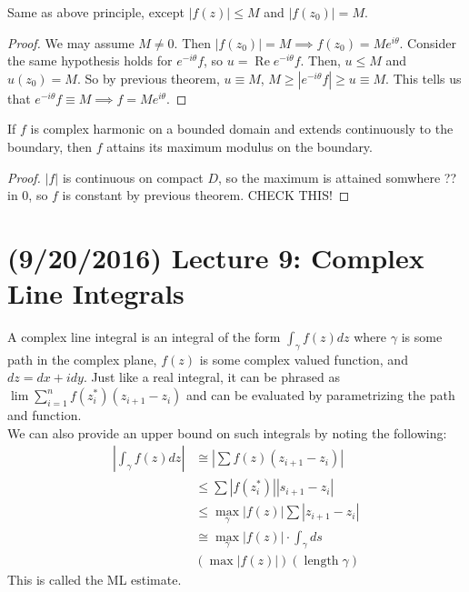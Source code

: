 \documentclass[11pt,leqno,oneside]{amsart}
\renewcommand{\Re}{\operatorname{Re}}
\begin{document}
  \begin{thm}
    Same as above principle, except $|f(z)| \leq M$ and $|f(z_0)| =
    M$.
  \end{thm}
  \begin{proof}
    We may assume $M \neq 0$. Then $|f(z_0)| = M \implies f(z_0) =
    Me^{i\theta}$. Consider the same hypothesis holds for
    $e^{-i\theta}f$, so $u = \Re e^{-i\theta}f$. Then, $u \leq M$ and
    $u(z_0) = M$. So by previous theorem, $u \equiv M$, $M \geq
    |e^{-i\theta}f| \geq u \equiv M$. This tells us that
    $e^{-i\theta}f \equiv M \implies f = Me^{i\theta}$.
  \end{proof}
  \begin{thm}
    If $f$ is complex harmonic on a bounded domain and extends
    continuously to the boundary, then $f$ attains its maximum modulus
    on the boundary.
  \end{thm}
  \begin{proof}
    $|f|$ is continuous on compact $D$, so the maximum is attained
    somwhere ?? in 0, so $f$ is constant by previous theorem. CHECK THIS!
  \end{proof}
  \section{(9/20/2016) Lecture 9: Complex Line Integrals}
  A complex line integral is an integral of the form $\int_\gamma
  f(z)dz$ where $\gamma$ is some path in the complex plane, $f(z)$ is
  some complex valued function, and $dz = dx + idy$. Just like a real
  integral, it can be phrased as $\lim \sum_{i=1}^n
  f(z_i^*)(z_{i+1}-z_i)$ and can be evaluated by parametrizing the
  path and function. \\

  We can also provide an upper bound on such integrals by noting the
  following:
  \begin{align*}
    |\int_\gamma f(z)dz | & \cong |\sum f(z)(z_{i+1}-z_i)| \\
    \ & \leq \sum |f(z_i^*)||s_{i+1}-z_i| \\
    \ & \leq \max_\gamma |f(z)| \sum |z_{i+1}-z_i| \\
    \ & \cong \max_\gamma |f(z)| \cdot \int_\gamma ds \\
    \ & (\max |f(z)|)(\operatorname{length} \gamma)
  \end{align*}
  This is called the ML estimate.
\end{document}
